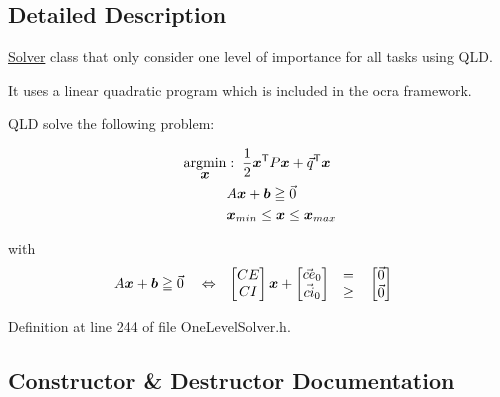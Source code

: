\subsection{Detailed Description}
\hyperlink{classocra_1_1Solver}{Solver} class that only consider one level of importance for all tasks using Q\+LD. 

It uses a linear quadratic program which is included in the ocra framework.

Q\+LD solve the following problem\+:

\begin{align*} \underset{\mbox{\boldmath${x}$}}{\operatorname{argmin}} &: \; \frac{1}{2} \mbox{\boldmath${x}$}^{\mathsf{T}} P \mbox{\boldmath${x}$} + \vec{q}^{\mathsf{T}} \mbox{\boldmath${x}$} \\ & A \mbox{\boldmath${x}$} + \mbox{\boldmath${b}$} \geqq \vec{0} \\ & \mbox{\boldmath${x}$}_{min} \leq \mbox{\boldmath${x}$} \leq \mbox{\boldmath${x}$}_{max} \end{align*}

with \begin{align*} A \mbox{\boldmath${x}$} + \mbox{\boldmath${b}$} &\geqq \vec{0} & &\Leftrightarrow &\begin{bmatrix} CE \\ CI \end{bmatrix} \mbox{\boldmath${x}$} + \begin{bmatrix} \vec{ce}_0 \\ \vec{ci}_0 \end{bmatrix} & \quad \begin{matrix} = \\ \geq \end{matrix} \quad \begin{bmatrix} \vec{0} \\ \vec{0} \end{bmatrix} \end{align*} 

Definition at line 244 of file One\+Level\+Solver.\+h.



\subsection{Constructor \& Destructor Documentation}
\hypertarget{classocra_1_1OneLevelSolverWithQLD_a75cf75293c527be3cbafb379bcddd758}{}\label{classocra_1_1OneLevelSolverWithQLD_a75cf75293c527be3cbafb379bcddd758} 
